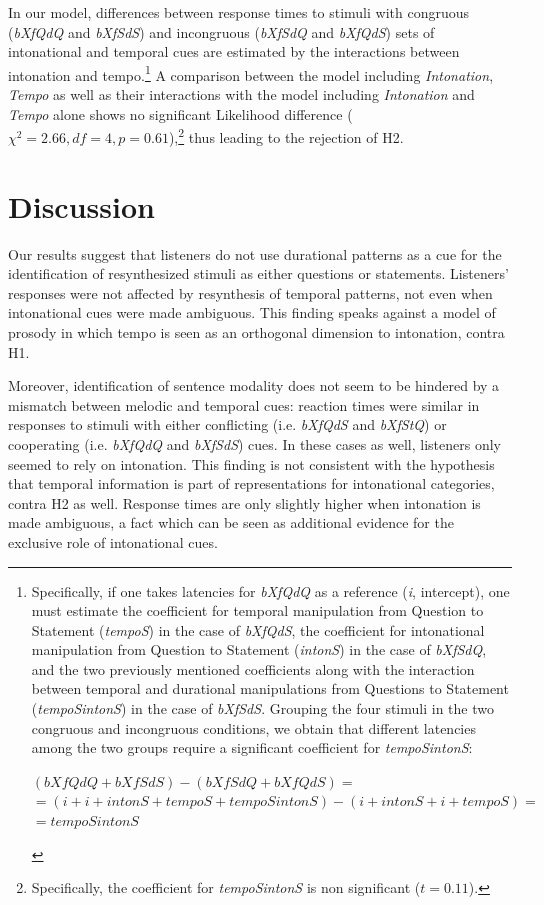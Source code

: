 In our model, differences between response times to stimuli with congruous (\textit{bXfQdQ} and \textit{bXfSdS}) and incongruous (\textit{bXfSdQ} and \textit{bXfQdS}) sets of intonational and temporal cues are estimated by the interactions between intonation and tempo.\footnote{Specifically, if one takes latencies for \textit{bXfQdQ} as a reference (\textit{i}, intercept), one must estimate the coefficient for temporal manipulation from Question to Statement (\textit{tempoS}) in the case of \textit{bXfQdS}, the coefficient for intonational manipulation from Question to Statement (\textit{intonS}) in the case of \textit{bXfSdQ}, and the two previously mentioned coefficients along with the interaction between temporal and durational manipulations from Questions to Statement (\textit{tempoSintonS}) in the case of \textit{bXfSdS}. Grouping the four stimuli in the two congruous and incongruous conditions, we obtain that different latencies among the two groups require a significant coefficient for \textit{tempoSintonS}:
\begin{center}
$(bXfQdQ + bXfSdS) - (bXfSdQ + bXfQdS) =$\\
$= (i + i + intonS + tempoS + tempoSintonS) - (i + intonS + i + tempoS) =$\\
$= tempoSintonS$
\end{center}} A comparison between the model including \textit{Intonation}, \textit{Tempo} as well as their interactions with the model including \textit{Intonation} and \textit{Tempo} alone shows no significant Likelihood difference ($\chi^{2}=2.66, df=4, p=0.61$),\footnote{Specifically, the coefficient for \textit{tempoSintonS} is non significant ($t=0.11$).} thus leading to the rejection of H2. 

\section{Discussion}\label{sec54}
Our results suggest that listeners do not use durational patterns as a cue for the identification of resynthesized stimuli as either questions or statements. Listeners' responses were not affected by resynthesis of temporal patterns, not even when intonational cues were made ambiguous. This finding speaks against a model of prosody in which tempo is seen as an orthogonal dimension to intonation, contra H1. 

Moreover, identification of sentence modality does not seem to be hindered by a mismatch between melodic and temporal cues: reaction times were similar in responses to stimuli with either conflicting (i.e. \textit{bXfQdS} and \textit{bXfStQ}) or cooperating (i.e. \textit{bXfQdQ} and \textit{bXfSdS}) cues. In these cases as well, listeners only seemed to rely on intonation. This finding is not consistent with the hypothesis that temporal information is part of representations for intonational categories, contra H2 as well. Response times are only slightly higher when intonation is made ambiguous, a fact which can be seen as additional evidence for the exclusive role of intonational cues. 

